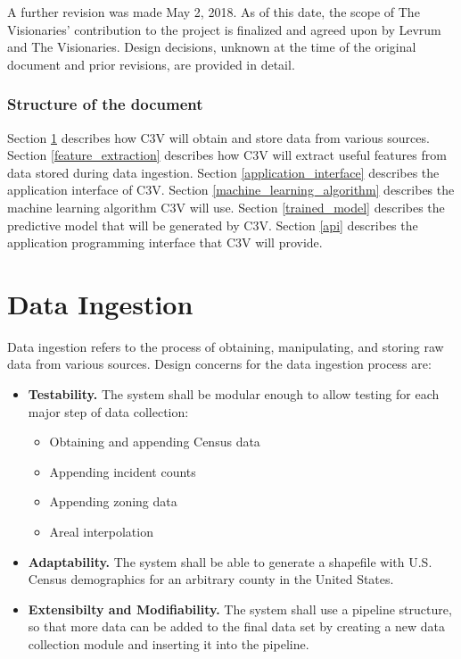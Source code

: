 \documentclass[onecolumn, draftclsnofoot,10pt, compsoc]{IEEEtran}
\begin{document}
\begin{singlespace}
        A further revision was made May 2, 2018. 
        As of this date, the scope of The Visionaries' contribution to the project is finalized and agreed upon 
        by Levrum and The Visionaries. 
        Design decisions, unknown at the time of the original document and prior revisions, are provided in detail.
        
        \subsubsection{Structure of the document}
        Section \ref{data_ingestion} describes how C3V will obtain and store data from various sources. 
        Section \ref{feature_extraction} describes how C3V will extract useful features from data stored during data ingestion. 
        Section \ref{application_interface} describes the application interface of C3V.
		Section \ref{machine_learning_algorithm} describes the machine learning algorithm C3V will use.
		Section \ref{trained_model} describes the predictive model that will be generated by C3V.
		Section \ref{api} describes the application programming interface that C3V will provide.

\section{Data Ingestion} \label{data_ingestion}
Data ingestion refers to the process of obtaining, manipulating, and storing raw data from various sources. 
Design concerns for the data ingestion process are:
\begin{itemize}
    \item \textbf{Testability.} The system shall be modular enough to allow testing for each major step of data collection: 
        \begin{itemize}
            \item Obtaining and appending Census data
            \item Appending incident counts
            \item Appending zoning data
            \item Areal interpolation
        \end{itemize}
    \item \textbf{Adaptability.} The system shall be able to generate a shapefile with U.S. Census demographics for an arbitrary county in the United States.  
    \item \textbf{Extensibilty and Modifiability.} The system shall use a pipeline structure, so that more data can be added to the final data set by creating a new data collection module and inserting it into the pipeline. 
\end{itemize}


\end{singlespace}
\end{document}
